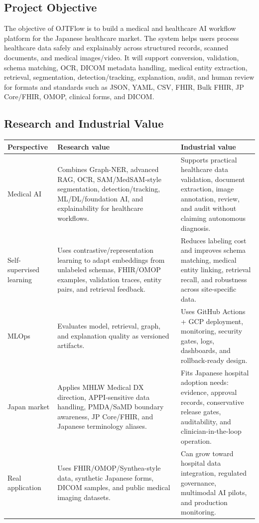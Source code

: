 \documentclass[11pt,a4paper]{article}
\newcommand{\projectname}{OJTFlow}
\begin{document}
\subsection{Project Objective}

The objective of \projectname{} is to build a medical and healthcare AI workflow platform for the Japanese healthcare market. The system helps users process healthcare data safely and explainably across structured records, scanned documents, and medical images/video. It will support conversion, validation, schema matching, OCR, DICOM metadata handling, medical entity extraction, retrieval, segmentation, detection/tracking, explanation, audit, and human review for formats and standards such as JSON, YAML, CSV, FHIR, Bulk FHIR, JP Core/FHIR, OMOP, clinical forms, and DICOM.

\subsection{Research and Industrial Value}

\begin{tabularx}{\textwidth}{p{}X X}
\toprule
\textbf{Perspective} & \textbf{Research value} & \textbf{Industrial value} \\
\midrule
Medical AI & Combines Graph-NER, advanced RAG, OCR, SAM/MedSAM-style segmentation, detection/tracking, ML/DL/foundation AI, and explainability for healthcare workflows. & Supports practical healthcare data validation, document extraction, image annotation, review, and audit without claiming autonomous diagnosis. \\
Self-supervised learning & Uses contrastive/representation learning to adapt embeddings from unlabeled schemas, FHIR/OMOP examples, validation traces, entity pairs, and retrieval feedback. & Reduces labeling cost and improves schema matching, medical entity linking, retrieval recall, and robustness across site-specific data. \\
MLOps & Evaluates model, retrieval, graph, and explanation quality as versioned artifacts. & Uses GitHub Actions + GCP deployment, monitoring, security gates, logs, dashboards, and rollback-ready design. \\
Japan market & Applies MHLW Medical DX direction, APPI-sensitive data handling, PMDA/SaMD boundary awareness, JP Core/FHIR, and Japanese terminology aliases. & Fits Japanese hospital adoption needs: evidence, approval records, conservative release gates, auditability, and clinician-in-the-loop operation. \\
Real application & Uses FHIR/OMOP/Synthea-style data, synthetic Japanese forms, DICOM samples, and public medical imaging datasets. & Can grow toward hospital data integration, regulated governance, multimodal AI pilots, and production monitoring. \\
\bottomrule
\end{tabularx}
\end{document}
